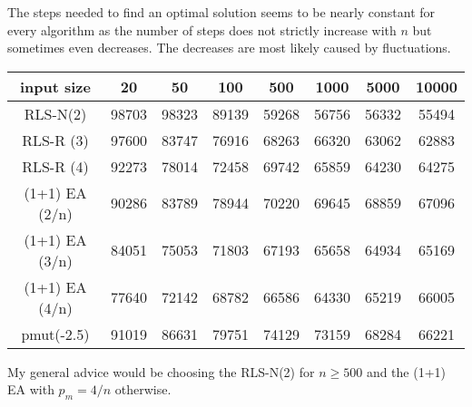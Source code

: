 The steps needed to find an optimal solution seems to be nearly constant for every algorithm as the number of steps does not strictly increase with $n$ but sometimes even decreases.
The decreases are most likely caused by fluctuations.

\begin{tabular}[h]{cccccccc}
      input size     & 20    & 50    & 100   & 500   & 1000  & 5000  & 10000 \\\hline
      RLS-N(2)       & 98703 & 98323 & 89139 & 59268 & 56756 & 56332 & 55494 \\
      RLS-R (3)      & 97600 & 83747 & 76916 & 68263 & 66320 & 63062 & 62883 \\
      RLS-R (4)      & 92273 & 78014 & 72458 & 69742 & 65859 & 64230 & 64275 \\
      (1+1) EA (2/n) & 90286 & 83789 & 78944 & 70220 & 69645 & 68859 & 67096 \\
      (1+1) EA (3/n) & 84051 & 75053 & 71803 & 67193 & 65658 & 64934 & 65169 \\
      (1+1) EA (4/n) & 77640 & 72142 & 68782 & 66586 & 64330 & 65219 & 66005 \\
      pmut(-2.5)     & 91019 & 86631 & 79751 & 74129 & 73159 & 68284 & 66221 \\
\end{tabular}

My general advice would be choosing the RLS-N(2) for $n\ge500$ and the (1+1) EA with $p_m=4/n$ otherwise.